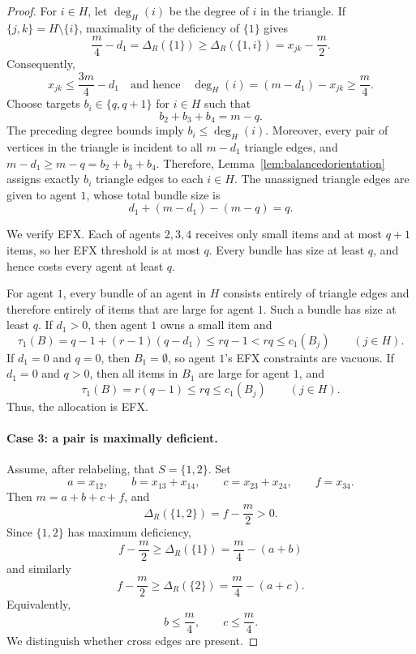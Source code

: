 \documentclass{article}
\theoremstyle{definition}
\begin{document}
\begin{proof}
For $i\in H$, let $\deg_H(i)$ be the degree of $i$ in the triangle.  If
$\{j,k\}=H\setminus\{i\}$, maximality of the deficiency of $\{1\}$ gives
\[
 \frac m4-d_1=\Delta_R(\{1\})
 \ge \Delta_R(\{1,i\})
 =x_{jk}-\frac m2.
\]
Consequently,
\[
 x_{jk}\le \frac{3m}{4}-d_1
 \quad\text{and hence}\quad
 \deg_H(i)=(m-d_1)-x_{jk}\ge \frac m4.
\]
Choose targets $b_i\in\{q,q+1\}$ for $i\in H$ such that
\[
 b_2+b_3+b_4=m-q.
\]
The preceding degree bounds imply $b_i\le \deg_H(i)$.  Moreover, every pair
of vertices in the triangle is incident to all $m-d_1$ triangle edges, and
$m-d_1\ge m-q=b_2+b_3+b_4$.  Therefore, Lemma~\ref{lem:balancedorientation}
assigns exactly $b_i$ triangle edges to each $i\in H$.  The unassigned
triangle edges are given to agent $1$, whose total bundle size is
\[
 d_1+(m-d_1)-(m-q)=q.
\]

We verify EFX.  Each of agents $2,3,4$ receives only small items and at most
$q+1$ items, so her EFX threshold is at most $q$.  Every bundle has size at
least $q$, and hence costs every agent at least $q$.

For agent $1$, every bundle of an agent in $H$ consists entirely of triangle
edges and therefore entirely of items that are large for agent $1$.  Such a
bundle has size at least $q$.  If $d_1>0$, then agent $1$ owns a small item and
\[
 \tau_1(B)
 =q-1+(r-1)(q-d_1)
 \le rq-1
 <rq
 \le c_1(B_j)
 \qquad(j\in H).
\]
If \(d_1=0\) and \(q=0\), then \(B_1=\emptyset\), so agent \(1\)'s
EFX constraints are vacuous.  If \(d_1=0\) and \(q>0\), then all items
in \(B_1\) are large for agent \(1\), and
\[
    \tau_1(B)=r(q-1)\le rq\le c_1(B_j)
    \qquad(j\in H).
\]
Thus, the allocation is EFX.



\paragraph{Case 3: a pair is maximally deficient.}
Assume, after relabeling, that $S=\{1,2\}$.  Set
\[
 a=x_{12},\qquad
 b=x_{13}+x_{14},\qquad
 c=x_{23}+x_{24},\qquad
 f=x_{34}.
\]
Then $m=a+b+c+f$, and
\[
 \Delta_R(\{1,2\})=f-\frac m2>0.
\]
Since $\{1,2\}$ has maximum deficiency,
\[
 f-\frac m2\ge \Delta_R(\{1\})
 =\frac m4-(a+b)
\]
and similarly
\[
 f-\frac m2\ge \Delta_R(\{2\})
 =\frac m4-(a+c).
\]
Equivalently,
\begin{equation}\label{eqn:bcbound}
     b\le \frac m4,
 \qquad
 c\le \frac m4.
\end{equation}
We distinguish whether cross edges are present.


\end{proof}
\end{document}
